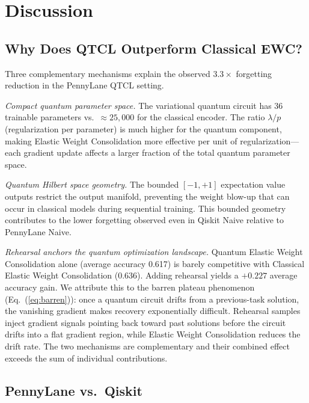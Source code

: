 \documentclass[a4paper,nopdfoutputerror]{quantumarticle}
\begin{document}
\section{Discussion}
\label{sec:discussion}

\subsection{Why Does QTCL Outperform Classical EWC?}

Three complementary mechanisms explain the observed $3.3\times$ forgetting
reduction in the PennyLane QTCL setting.

\noindent\textit{Compact quantum parameter space.}
The variational quantum circuit has 36 trainable parameters vs.\
$\approx 25{,}000$ for the classical encoder.
The ratio $\lambda / p$ (regularization per parameter) is much higher for
the quantum component, making Elastic Weight Consolidation more effective per
unit of regularization---each gradient update affects a larger fraction of
the total quantum parameter space.

\noindent\textit{Quantum Hilbert space geometry.}
The bounded $[-1,+1]$ expectation value outputs restrict the output manifold,
preventing the weight blow-up that can occur in classical models during
sequential training.
This bounded geometry contributes to the lower forgetting observed even in
Qiskit Naive relative to PennyLane Naive.

\noindent\textit{Rehearsal anchors the quantum optimization landscape.}
Quantum Elastic Weight Consolidation alone (average accuracy 0.617) is barely
competitive with Classical Elastic Weight Consolidation (0.636).
Adding rehearsal yields a $+0.227$ average accuracy gain.
We attribute this to the barren plateau phenomenon (Eq.~(\ref{eq:barren})):
once a quantum circuit drifts from a previous-task solution, the vanishing
gradient makes recovery exponentially difficult.
Rehearsal samples inject gradient signals pointing back toward past solutions
before the circuit drifts into a flat gradient region, while Elastic Weight
Consolidation reduces the drift rate.
The two mechanisms are complementary and their combined effect exceeds the
sum of individual contributions.

\subsection{PennyLane vs.\ Qiskit}
\end{document}
